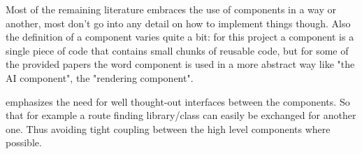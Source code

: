 Most of the remaining literature embraces the use of components in a way or another, most don't go into any detail on
how to implement things though. Also the definition of a component varies quite a bit: for this project a component is a
single piece of code that contains small chunks of reusable code, but for some of the provided papers the word component
is used in a more abstract way like "the AI component", the "rendering component". 

\cite{Rollings.2003} emphasizes the need for well thought-out interfaces between the components. So that for example a
route finding library/class can easily be exchanged for another one. Thus avoiding tight coupling between the high
level components where possible.


